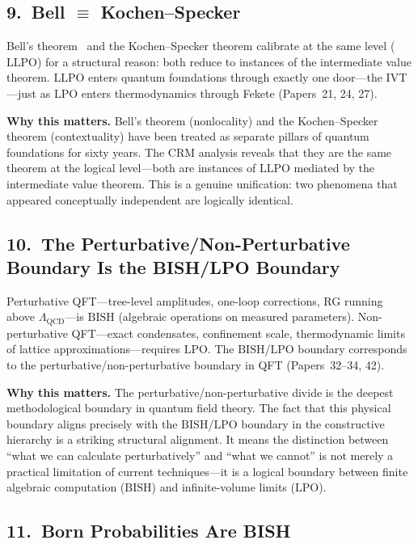 \documentclass[11pt,a4paper]{report}
\theoremstyle{plain}
\theoremstyle{definition}
\theoremstyle{remark}
\newcommand{\BISH}{\mathrm{BISH}}
\newcommand{\LLPO}{\mathrm{LLPO}}
\newcommand{\LPO}{\mathrm{LPO}}
\begin{document}
\subsection*{9.\ Bell $\equiv$ Kochen--Specker}

Bell's theorem~\cite{Bell1964} and the Kochen--Specker theorem calibrate at the same level ($\LLPO$) for a structural reason: both reduce to instances of the intermediate value theorem.  $\LLPO$ enters quantum foundations through exactly one door---the IVT---just as $\LPO$ enters thermodynamics through Fekete (Papers~21, 24, 27).

\medskip\noindent
\textbf{Why this matters.}\quad
Bell's theorem (nonlocality) and the Kochen--Specker theorem (contextuality) have been treated as separate pillars of quantum foundations for sixty years.  The CRM analysis reveals that they are the same theorem at the logical level---both are instances of $\LLPO$ mediated by the intermediate value theorem.  This is a genuine unification: two phenomena that appeared conceptually independent are logically identical.

\subsection*{10.\ The Perturbative/Non-Perturbative Boundary Is the BISH/LPO Boundary}

Perturbative QFT---tree-level amplitudes, one-loop corrections, RG running above $\Lambda_\mathrm{QCD}$---is $\BISH$ (algebraic operations on measured parameters).  Non-perturbative QFT---exact condensates, confinement scale, thermodynamic limits of lattice approximations---requires $\LPO$.  The $\BISH$/$\LPO$ boundary corresponds to the perturbative/non-perturbative boundary in QFT (Papers~32--34, 42).

\medskip\noindent
\textbf{Why this matters.}\quad
The perturbative/non-perturbative divide is the deepest methodological boundary in quantum field theory.  The fact that this physical boundary aligns precisely with the $\BISH$/$\LPO$ boundary in the constructive hierarchy is a striking structural alignment.  It means the distinction between ``what we can calculate perturbatively'' and ``what we cannot'' is not merely a practical limitation of current techniques---it is a logical boundary between finite algebraic computation ($\BISH$) and infinite-volume limits ($\LPO$).

\subsection*{11.\ Born Probabilities Are BISH}
\end{document}
